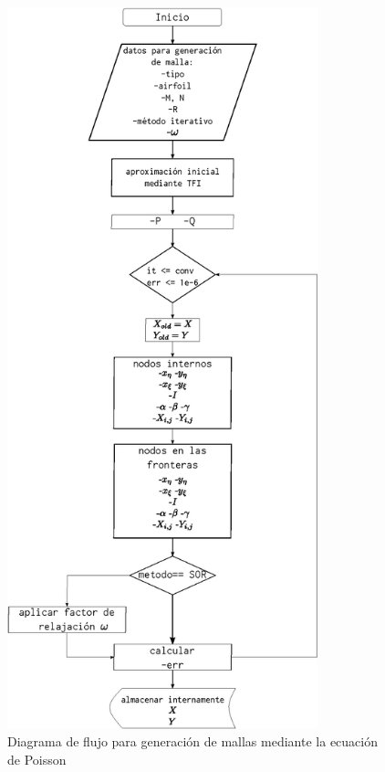 \documentclass[letterpaper, openright, 12pt]{book}
\begin{document}
    \begin{figure}[htbp!]
        \centering
        \includegraphics[keepaspectratio, width=90mm]
            {./img/flujo_poisson}
        \caption{Diagrama de flujo para generación de mallas mediante la
            ecuación de Poisson}
        \label{flujo_poisson}
    \end{figure}
\end{document}
